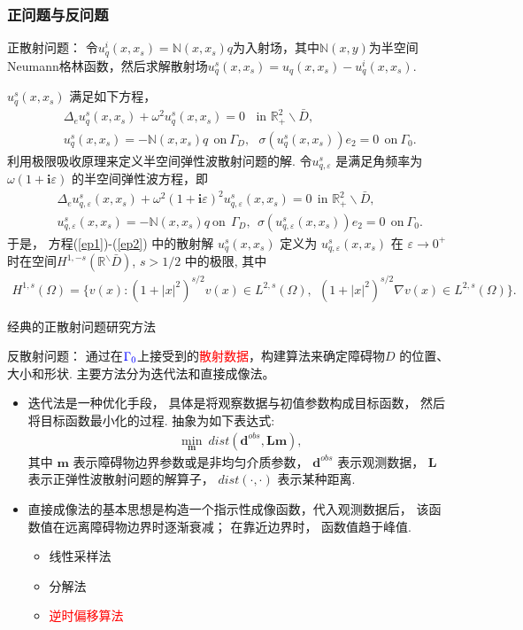 \documentclass[8pt]{beamer}
\newcommand{\R}{\mathbb{R}}
\renewcommand{\i}{\mathbf{i}}
\newcommand{\om}{\omega}
\newcommand{\ep}{\varepsilon}
\newcommand{\Ga}{\Gamma}
\newcommand{\Om}{\Omega}
\newcommand{\bks}{\backslash}
\renewcommand{\i}{\mathbf{i}}
\newcommand{\N}{\mathbb{N}}
\newcommand{\be}{\begin{eqnarray}}
\newcommand{\ee}{\end{eqnarray}}
\newcommand{\ben}{\begin{eqnarray*}}
\newcommand{\een}{\end{eqnarray*}}
\begin{document}
\begin{frame}
\frametitle{正问题与反问题}
	\begin{block}{正散射问题：}
		令$u^i_q(x,x_s)=\N(x,x_s)q$为入射场，其中$\N(x,y)$为半空间Neumann格林函数，然后求解散射场$u^s_q(x,x_s)=u_q(x,x_s)-u^i_q(x,x_s)$.
	\end{block}
\pause
$u_q^s(x,x_s)$ 满足如下方程，
\be
& &\Delta_e u_q^s(x,x_s)+ \omega^2u_q^s(x,x_s)= 0 \ \ \ \ \mbox{in }\R_+^2\bks \bar{D},\label{ep1}\\
& &u^s_q(x,x_s)=-\N(x,x_s)q \ \ \mbox{on} \ \Ga_D,\ \ \ \sigma(u_q^s(x,x_s))e_2=0 \ \ \mbox{on} \ \Ga_0.\label{ep2}
\ee
\pause
利用极限吸收原理来定义半空间弹性波散射问题的解.  令$u^s_{q,\ep}$ 是满足角频率为 $\om(1+\i\ep)$ 的半空间弹性波方程，即
\ben
& &\Delta_e u_{q,\ep}^s(x,x_s)+ \omega^2(1+\i\ep)^2 u_{q,\ep}^s(x,x_s)= 0 \ \  \mbox{in }\R_+^2\bks \bar{D},\label{p12}\\
& &u^s_{q,\ep}(x,x_s)=-\N(x,x_s)q \  \mbox{on} \ \  \Ga_D,\ \ \sigma(u_{q,\ep}^s(x,x_s))e_2=0 \ \  \mbox{on} \  \Ga_0 .\label{p22}
\een
于是， 方程(\ref{ep1})-(\ref{ep2}) 中的散射解 $u_q^s(x,x_s)$ 定义为 $u_{q,\ep}^s(x,x_s)$ 在 $\ep\to 0^+$ 时在空间$H^{1,-s}(\R^\bks\bar{D})$, $s>1/2$ 中的极限, 其中
\ben
H^{1,s}(\Om)=\{v(x): (1+|x|^2)^{s/2}v(x)\in L^{2,s}(\Om) , \ \  (1+|x|^2)^{s/2}\nabla v(x)\in L^{2,s}(\Om)   \}.
\een
\end{frame}

\begin{frame}
    \begin{block}{经典的正散射问题研究方法}
    	
    \end{block}
\end{frame}
\begin{frame}
	\begin{block}{反散射问题：}
		 通过在$\textcolor{blue}{\Gamma_0}$上接受到的\textcolor{red}{散射数据}，构建算法来确定障碍物$D$ 的位置、大小和形状. 主要方法分为迭代法和直接成像法。
	\end{block}
\vspace{.5cm}
\pause
\begin{itemize}
	\item 迭代法是一种优化手段， 具体是将观察数据与初值参数构成目标函数， 然后将目标函数最小化的过程.  抽象为如下表达式:
	\ben
	\min_{\mathbf{m}} \ dist(\mathbf{d}^{obs},\mathbf{{L}}\mathbf{m}),
	\een
	其中 $\mathbf m$ 表示障碍物边界参数或是非均匀介质参数， $\mathbf{d}^{obs}$ 表示观测数据， $\mathbf{{L}}$ 表示正弹性波散射问题的解算子， $dist(\cdot,\cdot)$ 表示某种距离.
	
	\bigskip
	\pause
	\item 直接成像法的基本思想是构造一个指示性成像函数，代入观测数据后， 该函数值在远离障碍物边界时逐渐衰减； 在靠近边界时， 函数值趋于峰值.
	\begin{itemize}
		\item 线性采样法
		\item 分解法
		\item \textcolor{red}{逆时偏移算法}
	\end{itemize}
\end{itemize} 
\end{frame}
\end{document}
